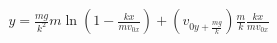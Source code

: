 \documentclass[preview]{standalone}
\begin{document}
\begin{align*}
y=\frac{mg}{k^2}m\ln(1-\frac{kx}{mv_{0x}})+(v_{0y+\frac{mg}{k}})\frac{m}{k}\frac{kx}{mv_{0x}}
\end{align*}
\end{document}
